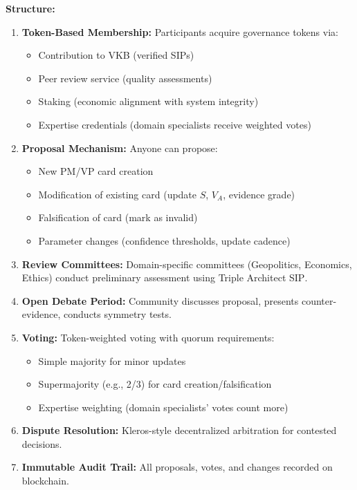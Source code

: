 \documentclass[11pt,a4paper]{article}
\theoremstyle{definition}
\theoremstyle{remark}
\newcommand{\VKB}{\textsc{VKB}}
\newcommand{\SIP}{\textsc{SIP}}
\begin{document}
\begin{mdframed}[style=daobox, frametitle={DAO Governance Model}]
\textbf{Structure:}
\begin{enumerate}
    \item \textbf{Token-Based Membership:} Participants acquire governance tokens via:
    \begin{itemize}
        \item Contribution to \VKB{} (verified \SIP{}s)
        \item Peer review service (quality assessments)
        \item Staking (economic alignment with system integrity)
        \item Expertise credentials (domain specialists receive weighted votes)
    \end{itemize}
    
    \item \textbf{Proposal Mechanism:} Anyone can propose:
    \begin{itemize}
        \item New PM/VP card creation
        \item Modification of existing card (update $S$, $V_A$, evidence grade)
        \item Falsification of card (mark as invalid)
        \item Parameter changes (confidence thresholds, update cadence)
    \end{itemize}
    
    \item \textbf{Review Committees:} Domain-specific committees (Geopolitics, Economics, Ethics) conduct preliminary assessment using Triple Architect \SIP{}.
    
    \item \textbf{Open Debate Period:} Community discusses proposal, presents counter-evidence, conducts symmetry tests.
    
    \item \textbf{Voting:} Token-weighted voting with quorum requirements:
    \begin{itemize}
        \item Simple majority for minor updates
        \item Supermajority (e.g., 2/3) for card creation/falsification
        \item Expertise weighting (domain specialists' votes count more)
    \end{itemize}
    
    \item \textbf{Dispute Resolution:} Kleros-style decentralized arbitration for contested decisions.
    
    \item \textbf{Immutable Audit Trail:} All proposals, votes, and changes recorded on blockchain.
\end{enumerate}
\end{mdframed}
\end{document}
